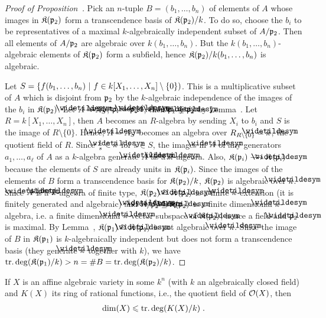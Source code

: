 \documentclass[a4paper,parskip=half,numbers=enddot, DIV=12]{scrreprt}
\renewcommand{\leq}{\leqslant}
\begin{document}
	\begin{proof}[Proof of Proposition~]
		Pick an $n$-tuple $B = (b_1,\ldots, b_n)$ of elements of $A$ whose images in $\mathfrak{K}(\mathfrak{p}_2)$ form a transcendence basis of $\mathfrak{K}(\mathfrak{p}_2)/k$. To do so, choose the $b_i$ to be representatives of a maximal $k$-algebraically independent subset of $A/\mathfrak{p}_2$. Then all elements of $A/\mathfrak{p}_2$ are algebraic over $k(b_1,\ldots,b_n)$. But the $k(b_1,\ldots,b_n)$-algebraic elements of $\mathfrak{K}(\mathfrak{p}_2)$ form a subfield, hence $\mathfrak{K}(\mathfrak{p}_2)/k(b_1,\ldots,b_n)$ is algebraic. 
		
		Let $S= \left\{f(b_1,\ldots,b_n)\ \middle|\  f\in  k[X_1,\ldots,X_n]\setminus\{0\}\right)$. This is a multiplicative subset of $A$ which is disjoint from $\mathfrak{p}_2$ by the $k$-algebraic independence of the images of the $b_i$ in $\mathfrak{K}(\mathfrak{p}_2)$. Let $\snake A=A_S$, $\snake\pp_i = \pp_i\snake A$, then $\snake \pp_1\subsetneq\snake\pp_2$ by Lemma~. Let $R=k\left[X_1,\ldots,X_n\right]$, then $A$ becomes an $R$-algebra by sending $X_i$ to $b_i$ and $S$ is the image of $R\setminus\{0\}$. Hence, $\snake A = A_S$ becomes an algebra over $R_{R\setminus\{0\}} = \snake k$, the quotient field of $R$. Since $\frac{1}{s}\in\snake k$ for $s\in S$, the images in $\snake A$ of any generators $a_1,\ldots,a_\ell$ of $A$ as a $k$-algebra generate $\snake A$ as a $\snake k$-algebra. Also, $\KK(\pp_i)\isomorphism \KK\left(\snake \pp_i\right)$ because the elements of $S$ are already units in $\mathfrak{K}(\mathfrak{p}_i)$. Since the images of the elements of $B$ form a transcendence basis for $\mathfrak{K}(\mathfrak{p}_2)/k$, $\mathfrak{K}(\mathfrak{p}_2)$ is algebraic over $\snake k$. Since $\snake A$ is a $\snake k$-algebra of finite type, $\KK(\pp_2)\cong \KK\left(\snake\pp_2\right)$ is a finite $\snake k$-extension (it is finitely generated and algebraic) and $\snake A/\snake\pp_2 \subseteq \KK(\snake \pp_2)$ is a finite dimensional $\snake k$-algebra, i.e. a finite dimensional $\snake k$-vector subspace of $\KK(\snake{\pp}_2)$, hence a field and $\snake\pp_2$ is maximal. By Lemma~, $\KK(\pp_1)\cong \KK\left(\snake\pp_1\right)$ is not algebraic over $\snake k$. Since the image of $B$ in $\mathfrak{K}(\mathfrak{p}_1)$ is $k$-algebraically independent but does not form a transcendence basis (they generate $\snake k$ together with $k$), we have $\operatorname{tr.deg}(\mathfrak{K}(\mathfrak{p}_1)/k)> n =\# B = \operatorname{tr.deg}(\mathfrak{K}(\mathfrak{p}_2)/k)$.
	\end{proof}
	\begin{cor}
		If $X$ is an affine algebraic variety in some $k^n$ (with $k$ an algebraically closed field) and $K(X)$ its ring of rational functions, i.e., the quotient field of $\mathcal{O}(X)$, then 
		\begin{align*}
			\dim (X)\leq \trdeg(K(X)/k)\;.
		\end{align*}
	\end{cor}
\end{document}

